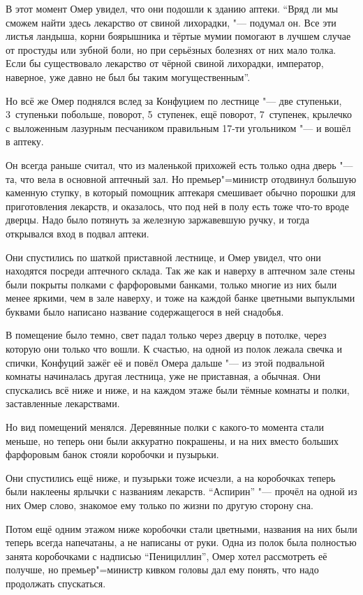В этот момент Омер увидел, что они подошли к зданию аптеки.
\enquote{Вряд ли мы сможем найти здесь лекарство от свиной лихорадки, "---
подумал он.
Все эти листья ландыша, корни боярышника и тёртые мумии помогают в лучшем случае
от простуды или зубной боли, но при серьёзных болезнях от них мало толка.
Если бы существовало лекарство от чёрной свиной лихорадки, император, наверное,
уже давно не был бы таким могущественным}.

Но всё же Омер поднялся вслед за Конфуцием по лестнице "--- две ступеньки,
3~ступеньки побольше, поворот, 5~ступенек, ещё поворот, 7~ступенек, крылечко с
выложенным лазурным песчаником правильным 17-ти угольником "--- и вошёл в аптеку.

Он всегда раньше считал, что из маленькой прихожей есть только одна дверь "---
та, что вела в основной аптечный зал.
Но премьер"=министр отодвинул большую каменную ступку, в который помощник
аптекаря смешивает обычно порошки для приготовления лекарств, и оказалось, что
под ней в полу есть тоже что-то вроде дверцы.
Надо было потянуть за железную заржавевшую ручку, и тогда открывался вход в
подвал аптеки.

Они спустились по шаткой приставной лестнице, и Омер увидел, что они находятся
посреди аптечного склада.
Так же как и наверху в аптечном зале стены были покрыты полками с фарфоровыми
банками, только многие из них были менее яркими, чем в зале наверху, и тоже на
каждой банке цветными выпуклыми буквами было написано название содержащегося в
ней снадобья.

В помещение было темно, свет падал только через дверцу в потолке, через которую
они только что вошли.
К счастью, на одной из полок лежала свечка и спички, Конфуций зажёг её и повёл
Омера дальше "--- из этой подвальной комнаты начиналась другая лестница, уже не
приставная, а обычная.
Они спускались всё ниже и ниже, и на каждом этаже были тёмные комнаты и полки,
заставленные лекарствами.

Но вид помещений менялся.
Деревянные полки с какого-то момента стали меньше, но теперь они были аккуратно
покрашены, и на них вместо больших фарфоровым банок стояли коробочки и пузырьки.

Они спустились ещё ниже, и пузырьки тоже исчезли, а на коробочках теперь были
наклеены ярлычки с названиям лекарств.
\enquote{Аспирин} "--- прочёл на одной из них Омер слово, знакомое ему только по
жизни по другую сторону сна.

Потом ещё одним этажом ниже коробочки стали цветными, названия на них были
теперь всегда напечатаны, а не написаны от руки.
Одна из полок была полностью занята коробочками с надписью \enquote{Пенициллин},
Омер хотел рассмотреть её получше, но премьер"=министр кивком головы дал ему
понять, что надо продолжать спускаться.

